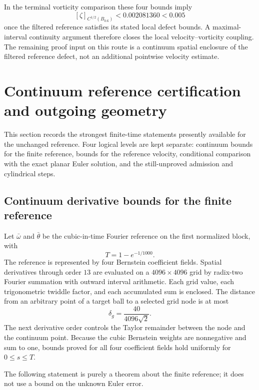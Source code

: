 \documentclass[11pt]{article}
\theoremstyle{definition}\newtheorem{definition}[theorem]{Definition}\newtheorem{problem}[theorem]{Problem}
\theoremstyle{remark}\newtheorem{remark}[theorem]{Remark}
\begin{document}
In the terminal vorticity comparison these four bounds imply
\[
[\zeta]_{C^{1/2}(B_{0.6})}<0.002081360<0.005
\]
once the filtered reference satisfies its stated local defect bounds.  A maximal-interval continuity argument therefore closes the local velocity--vorticity coupling.  The remaining proof input on this route is a continuum spatial enclosure of the filtered reference defect, not an additional pointwise velocity estimate.

\section{Continuum reference certification and outgoing geometry}
\label{sec:continuum-certification}
This section records the strongest finite-time statements presently available for the unchanged reference.  Four logical levels are kept separate: continuum bounds for the finite reference, bounds for the reference velocity, conditional comparison with the exact planar Euler solution, and the still-unproved admission and cylindrical steps.

\subsection{Continuum derivative bounds for the finite reference}
Let $\bar\omega$ and $\bar\theta$ be the cubic-in-time Fourier reference on the first normalized block, with
\[
T=1-e^{-1/1000}.
\]
The reference is represented by four Bernstein coefficient fields.  Spatial derivatives through order $13$ are evaluated on a $4096\times4096$ grid by radix-two Fourier summation with outward interval arithmetic.  Each grid value, each trigonometric twiddle factor, and each accumulated sum is enclosed.  The distance from an arbitrary point of a target ball to a selected grid node is at most
\[
\delta_g=\frac{40}{4096\sqrt2}.
\]
The next derivative order controls the Taylor remainder between the node and the continuum point.  Because the cubic Bernstein weights are nonnegative and sum to one, bounds proved for all four coefficient fields hold uniformly for $0\le s\le T$.

The following statement is purely a theorem about the finite reference; it does not use a bound on the unknown Euler error.
\end{document}
